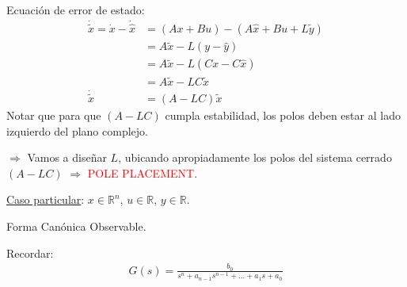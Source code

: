 Ecuación de error de estado:
\begin{align*}
    \dot{\tilde{x}}=\dot{x}-\dot{\hat{x}} &= (Ax+Bu)-(A\hat{x}+Bu+L\tilde{y})\\
    &= A\tilde{x}-L(y-\hat{y})\\
    &= A\tilde{x}-L(Cx-C\hat{x})\\
    &= A\tilde{x}-LC\tilde{x}\\
    \dot{\tilde{x}} &= (A-LC)\tilde{x}
\end{align*}
Notar que para que $(A-LC)$ cumpla estabilidad, los polos deben estar al lado izquierdo del plano complejo.\\
\par $\Longrightarrow$ Vamos a diseñar $L$, ubicando apropiadamente los polos del sistema cerrado $(A-LC)$ $\Longrightarrow$ \textcolor{red}{POLE PLACEMENT}.\\
\par \underline{Caso particular}: $x\in\mathbb{R}^n$, $u\in\mathbb{R}$, $y\in\mathbb{R}$.\\
\par Forma Canónica Observable. 
\par Recordar: 
\begin{align*}
    G(s) = \frac{b_0}{s^n+a_{n-1}s^{n-1}+...+a_1s+a_0}
\end{align*}

